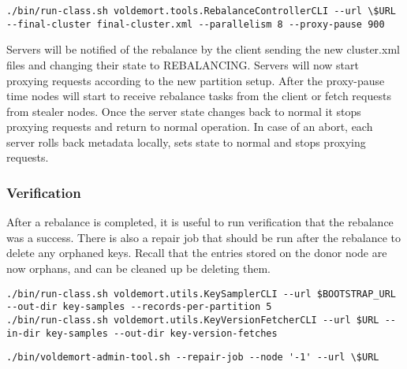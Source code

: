 \begin{lstlisting}[style=customc, caption=Sample command to execute the rebalance. Parallelism defines how many tasks can be run at the same time.]
./bin/run-class.sh voldemort.tools.RebalanceControllerCLI --url \$URL  --final-cluster final-cluster.xml --parallelism 8 --proxy-pause 900
\end{lstlisting}

Servers will be notified of the rebalance by the client sending the new cluster.xml files and changing their state to REBALANCING. Servers will now start proxying requests according to the new partition setup. After the proxy-pause time nodes will start to receive rebalance tasks from the client or fetch requests from stealer nodes. Once the server state changes back to normal it stops proxying requests and return to normal operation. In case of an abort, each server rolls back metadata locally, sets state to normal and stops proxying requests. 

\subsubsection{Verification}
After a rebalance is completed, it is useful to run verification that the rebalance was a success. There is also a repair job that should be run after the rebalance to delete any orphaned keys. Recall that the entries stored on the donor node are now orphans, and can be cleaned up be deleting them.

\begin{lstlisting}[style=customc, caption=Commands for pulling a key sample from a store and the versioned data objects stored under the keys. These are used to verify that the rebalance worked]
./bin/run-class.sh voldemort.utils.KeySamplerCLI --url $BOOTSTRAP_URL --out-dir key-samples --records-per-partition 5
./bin/run-class.sh voldemort.utils.KeyVersionFetcherCLI --url $URL --in-dir key-samples --out-dir key-version-fetches
\end{lstlisting}

\begin{lstlisting}[style=customc, caption=Sample repair job script. Passing -1 as node will run the script on all nodes.]
./bin/voldemort-admin-tool.sh --repair-job --node '-1' --url \$URL
\end{lstlisting}



